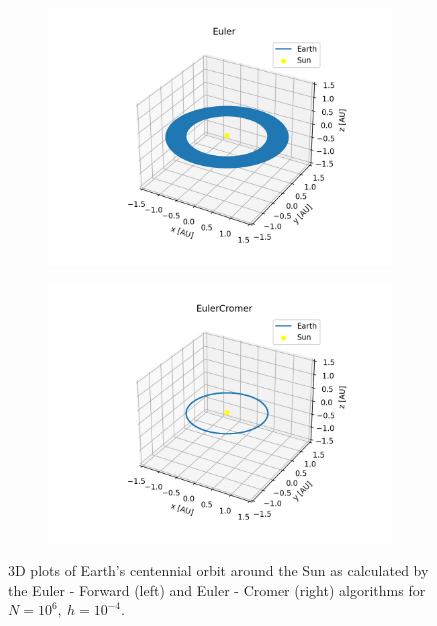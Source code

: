 	\begin{figure}[h!]
		\centering
		\begin{subfigure}{0.48\linewidth}
			\includegraphics[width=1.2\linewidth]{Figure/euler_forward_100years.png}
		\end{subfigure}
		\begin{subfigure}{0.48\linewidth}
			\includegraphics[width=1.15\linewidth]{Figure/eulercromer_100years.png}
		\end{subfigure}
		\caption{3D plots of Earth's centennial orbit around the Sun as calculated by the Euler - Forward (left) and Euler - Cromer (right) algorithms  for $N = 10^6,\ h = 10^{-4}$. }
		\label{eulers3100year}
	\end{figure}
